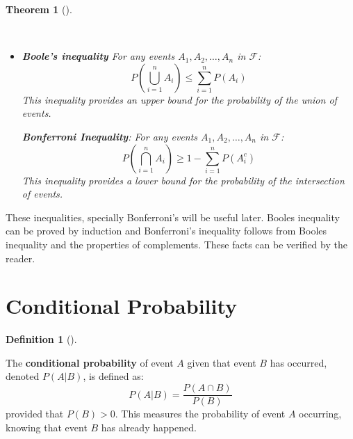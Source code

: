 \documentclass[
  letterpaper,
  DIV=11,
  numbers=noendperiod]{scrreport}
\theoremstyle{definition}
\theoremstyle{plain}
\newtheorem{theorem}{Theorem}[chapter]
\theoremstyle{plain}
\theoremstyle{definition}
\newtheorem{definition}{Definition}[chapter]
\theoremstyle{remark}
\begin{document}
\begin{tcolorbox}[enhanced jigsaw, opacitybacktitle=0.6, bottomtitle=1mm, opacityback=0, toprule=.15mm, colbacktitle=quarto-callout-note-color!10!white, colback=white, left=2mm, title={Boole and Bonferroni inequalities}, breakable, rightrule=.15mm, leftrule=.75mm, titlerule=0mm, colframe=quarto-callout-note-color-frame, arc=.35mm, coltitle=black, toptitle=1mm, bottomrule=.15mm]

\begin{theorem}[]\protect\hypertarget{thm-boole-bonferroni}{}\label{thm-boole-bonferroni}

~

\begin{itemize}
\item
  \textbf{Boole's inequality} For any events \(A_1, A_2, \ldots, A_n\)
  in \(\mathcal F\):
  \[ P\left(\bigcup_{i=1}^n A_i\right) \le \sum_{i=1}^n P(A_i) \] This
  inequality provides an upper bound for the probability of the union of
  events.

  \textbf{Bonferroni Inequality}: For any events
  \(A_1, A_2, \ldots, A_n\) in \(\mathcal F\):
  \[ P\left(\bigcap_{i=1}^n A_i\right) \ge 1 - \sum_{i=1}^n P(A_i^c) \]
  This inequality provides a lower bound for the probability of the
  intersection of events.
\end{itemize}

\end{theorem}

\end{tcolorbox}

These inequalities, specially Bonferroni's will be useful later. Booles
inequality can be proved by induction and Bonferroni's inequality
follows from Booles inequality and the properties of complements. These
facts can be verified by the reader.

\section{Conditional Probability}\label{conditional-probability}

\begin{tcolorbox}[enhanced jigsaw, opacitybacktitle=0.6, bottomtitle=1mm, opacityback=0, toprule=.15mm, colbacktitle=quarto-callout-note-color!10!white, colback=white, left=2mm, title={Conditional Probability}, breakable, rightrule=.15mm, leftrule=.75mm, titlerule=0mm, colframe=quarto-callout-note-color-frame, arc=.35mm, coltitle=black, toptitle=1mm, bottomrule=.15mm]

\begin{definition}[]\protect\hypertarget{def-cond-probability}{}\label{def-cond-probability}

The \textbf{conditional probability} of event \(A\) given that event
\(B\) has occurred, denoted \(P(A|B)\), is defined as:
\[ P(A|B) = \frac{P(A \cap B)}{P(B)} \] provided that \(P(B) > 0\). This
measures the probability of event \(A\) occurring, knowing that event
\(B\) has already happened.

\end{definition}

\end{tcolorbox}
\end{document}
